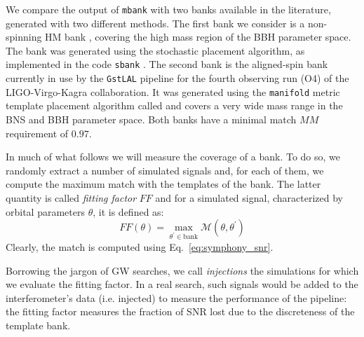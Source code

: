 \documentclass[twocolumn,showpacs,preprintnumbers,nofootinbib,prd,
superscriptaddress,10pt]{revtex4-2}
\begin{document}
We compare the output of \texttt{mbank} with two banks available in the literature, generated with two different methods.
The first bank we consider is a non-spinning HM bank \cite{Harry:2017weg}, covering the high mass region of the BBH parameter space. The bank was generated using the stochastic placement algorithm, as implemented in the code \texttt{sbank} \cite{Ajith:2012mn}.
The second bank is the aligned-spin bank \cite{Sakon:2022ibh} currently in use by the \texttt{GstLAL} pipeline \cite{PhysRevD.95.042001, gstlal_paper2} for the fourth observing run (O4) of the LIGO-Virgo-Kagra collaboration. It was generated using the \texttt{manifold} \cite{Hanna:2022zpk} metric template placement algorithm called and covers a very wide mass range in the BNS and BBH parameter space.
Both banks have a minimal match $MM$ requirement of $0.97$.

In much of what follows we will measure the coverage of a bank. To do so, we randomly extract a number of simulated signals and, for each of them, we compute the maximum match with the templates of the bank. The latter quantity is called {\it fitting factor} $FF$ and for a simulated signal, characterized by orbital parameters $\theta$, it is defined as:
%
\begin{equation}\label{eq:FF}
	FF(\theta) = \max_{\theta^\prime \in \text{bank}} \mathcal{M}(\theta, \theta^\prime)
\end{equation}
%
Clearly, the match is computed using Eq.~\eqref{eq:symphony_snr}.

Borrowing the jargon of GW searches, we call {\it injections} the simulations for which we evaluate the fitting factor. In a real search, such signals would be added to the interferometer's data (i.e. injected) to measure the performance of the pipeline: the fitting factor measures the fraction of SNR lost due to the discreteness of the template bank.

\end{document}
